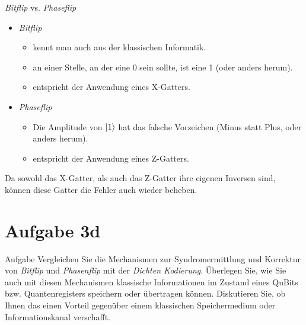 \documentclass[fleqn,compress,utf8,aspectratio=169,t]{beamer}
\begin{document}
\begin{frame}{\textit{Bitflip} vs. \textit{Phaseflip}}
\begin{itemize}
	\item \textit{Bitflip}
	\begin{itemize}
		\item kennt man auch aus der klassischen Informatik.
		\item an einer Stelle, an der eine 0 sein sollte, ist eine 1 (oder anders herum).
		\item entspricht der Anwendung eines X-Gatters.
	\end{itemize}
	\item \textit{Phaseflip}
	\begin{itemize}
		\item Die Amplitude von $\ket{1}$ hat das falsche Vorzeichen (Minus statt Plus, oder anders herum).
		\item entspricht der Anwendung eines Z-Gatters.
	\end{itemize}
\end{itemize}
Da sowohl das X-Gatter, als auch das Z-Gatter ihre eigenen Inversen sind, können diese Gatter die Fehler auch wieder beheben.
\end{frame}

\section{Aufgabe 3d}

\begin{frame}{Aufgabe}
Vergleichen Sie die Mechanismen zur Syndromermittlung und Korrektur von \textit{Bitflip} und \textit{Phasenflip} mit der \textit{Dichten Kodierung}. Überlegen Sie, wie Sie auch mit diesen Mechanismen klassische Informationen im Zustand eines QuBits bzw. Quantenregisters speichern oder übertragen können. Diskutieren Sie, ob Ihnen das einen Vorteil gegenüber einem klassischen Speichermedium oder Informationskanal verschafft.
\end{frame}
\end{document}
